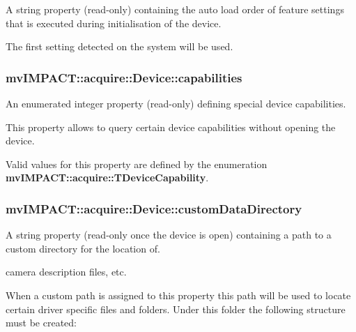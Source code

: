 A string property {\bfseries }(read-\/only) containing the auto load order of feature settings that is executed during initialisation of the device. 

The first setting detected on the system will be used. \hypertarget{classmv_i_m_p_a_c_t_1_1acquire_1_1_device_ae12276c8f5655fa8d771774804e53c13}{
\subsubsection[{capabilities}]{ mv\+I\+M\+P\+A\+C\+T\+::acquire\+::\+Device\+::capabilities}}\label{classmv_i_m_p_a_c_t_1_1acquire_1_1_device_ae12276c8f5655fa8d771774804e53c13}


An enumerated integer property {\bfseries }(read-\/only) defining special device capabilities. 

This property allows to query certain device capabilities without opening the device.

Valid values for this property are defined by the enumeration {\bfseries mv\+I\+M\+P\+A\+C\+T\+::acquire\+::\+T\+Device\+Capability}. \hypertarget{classmv_i_m_p_a_c_t_1_1acquire_1_1_device_a356137fa9ec71b56e7981276aaf3c4f2}{
\subsubsection[{custom\+Data\+Directory}]{ mv\+I\+M\+P\+A\+C\+T\+::acquire\+::\+Device\+::custom\+Data\+Directory}}\label{classmv_i_m_p_a_c_t_1_1acquire_1_1_device_a356137fa9ec71b56e7981276aaf3c4f2}


A string property {\bfseries }(read-\/only once the device is open) containing a path to a custom directory for the location of. 

camera description files, etc.

When a custom path is assigned to this property this path will be used to locate certain driver specific files and folders. Under this folder the following structure must be created\+:



